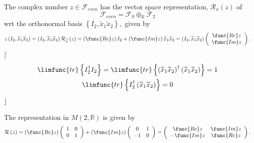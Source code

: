 \documentclass[aps,preprint]{revtex4}
\begin{document}
The complex number $z\in \mathcal{F}_{even}$ has the vector space
representation, $\mathcal{R}_{x}\left( z\right) $ of 
\begin{equation}
\mathcal{F}_{even}=\mathcal{F}_{0}\oplus _{\mathbb{R}}\mathcal{F}_{2}
\end{equation}%
wrt the orthonormal basis $\left\{ I_{2},\widetilde{x}_{1}\widetilde{x}%
_{2}\right\} ,$ given by 
\begin{equation}
z\left( I_{2},\widetilde{x}_{1}\widetilde{x}_{2}\right) =\left( I_{2},%
\widetilde{x}_{1}\widetilde{x}_{2}\right) \mathcal{R}_{\widetilde{x}}\left(
z\right) =\left( \func{Re}z\right) I_{2}+\left( \func{Im}z\right) \widetilde{%
x}_{1}\widetilde{x}_{2}=\left( I_{2},\widetilde{x}_{1}\widetilde{x}%
_{2}\right) \left( 
\begin{array}{c}
\func{Re}z \\ 
\func{Im}z%
\end{array}%
\right) .
\end{equation}%
$\lceil $%
\begin{gather}
\limfunc{tr}\left\{ I_{2}^{\dagger }I_{2}\right\} =\limfunc{tr}\left\{
\left( \widetilde{x}_{1}\widetilde{x}_{2}\right) ^{\dagger }\left( 
\widetilde{x}_{1}\widetilde{x}_{2}\right) \right\} =1 \\
\limfunc{tr}\left\{ I_{2}^{\dagger }\left( \widetilde{x}_{1}\widetilde{x}%
_{2}\right) \right\} =0
\end{gather}%
$\rfloor $

The representation in $M\left( 2,\mathbb{R}\right) $ is given by 
\begin{equation}
\mathcal{R}\left( z\right) =\left( \func{Re}z\right) \left( 
\begin{array}{cc}
1 & 0 \\ 
0 & 1%
\end{array}%
\right) +\left( \func{Im}z\right) \left( 
\begin{array}{cc}
0 & 1 \\ 
-1 & 0%
\end{array}%
\right) =\left( 
\begin{array}{cc}
\func{Re}z & \func{Im}z \\ 
-\func{Im}z & \func{Re}z%
\end{array}%
\right) .
\end{equation}
\end{document}
